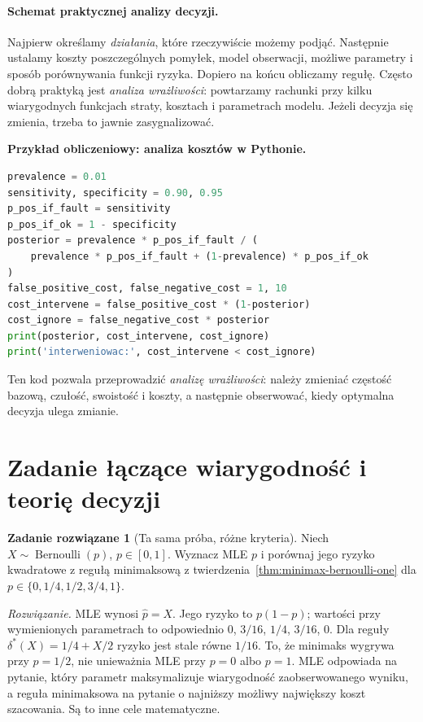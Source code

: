 \documentclass[11pt,a4paper,oneside]{report}
\numberwithin{equation}{chapter}
\theoremstyle{plain}
\theoremstyle{definition}
\newtheorem{zadanie}{Zadanie rozwiązane}[chapter]
\theoremstyle{remark}
\begin{document}
\paragraph{Schemat praktycznej analizy decyzji.}
Najpierw określamy \emph{działania}, które rzeczywiście możemy podjąć.
Następnie ustalamy koszty poszczególnych pomyłek, model obserwacji,
możliwe parametry i sposób porównywania funkcji ryzyka. Dopiero
na końcu obliczamy regułę. Często dobrą praktyką jest \emph{analiza
wrażliwości}: powtarzamy rachunki przy kilku wiarygodnych funkcjach
straty, kosztach i parametrach modelu. Jeżeli decyzja się zmienia,
trzeba to jawnie zasygnalizować.

\noindent\textbf{Przykład obliczeniowy: analiza kosztów w Pythonie.}\par
\par
{}
\smallskip
\begin{lstlisting}[language=Python,caption={Wpływ kosztów pomyłek na decyzję (Python).}]
prevalence = 0.01
sensitivity, specificity = 0.90, 0.95
p_pos_if_fault = sensitivity
p_pos_if_ok = 1 - specificity
posterior = prevalence * p_pos_if_fault / (
    prevalence * p_pos_if_fault + (1-prevalence) * p_pos_if_ok
)
false_positive_cost, false_negative_cost = 1, 10
cost_intervene = false_positive_cost * (1-posterior)
cost_ignore = false_negative_cost * posterior
print(posterior, cost_intervene, cost_ignore)
print('interweniowac:', cost_intervene < cost_ignore)
\end{lstlisting}
Ten kod pozwala przeprowadzić \emph{analizę wrażliwości}: należy
zmieniać częstość bazową, czułość, swoistość i koszty, a następnie
obserwować, kiedy optymalna decyzja ulega zmianie.

\section{Zadanie łączące wiarygodność i teorię decyzji}
\begin{zadanie}[Ta sama próba, różne kryteria]\label{zad:compare-likelihood-decision}
Niech $X\sim\operatorname{Bernoulli}(p)$, $p\in[0,1]$.
Wyznacz MLE $p$ i porównaj jego ryzyko kwadratowe z regułą minimaksową
z twierdzenia~\ref{thm:minimax-bernoulli-one} dla
$p\in\{0,1/4,1/2,3/4,1\}$.
\par\emph{Rozwiązanie.} MLE wynosi $\widehat p=X$.
Jego ryzyko to $p(1-p)$; wartości przy wymienionych parametrach to
odpowiednio $0$, $3/16$, $1/4$, $3/16$, $0$.
Dla reguły $\delta^*(X)=1/4+X/2$ ryzyko jest stale równe $1/16$.
To, że minimaks wygrywa przy $p=1/2$, nie unieważnia MLE przy
$p=0$ albo $p=1$. MLE odpowiada na pytanie, który parametr
maksymalizuje wiarygodność zaobserwowanego wyniku, a reguła
minimaksowa na pytanie o najniższy możliwy największy koszt
szacowania. Są to inne cele matematyczne.
\end{zadanie}
\end{document}
